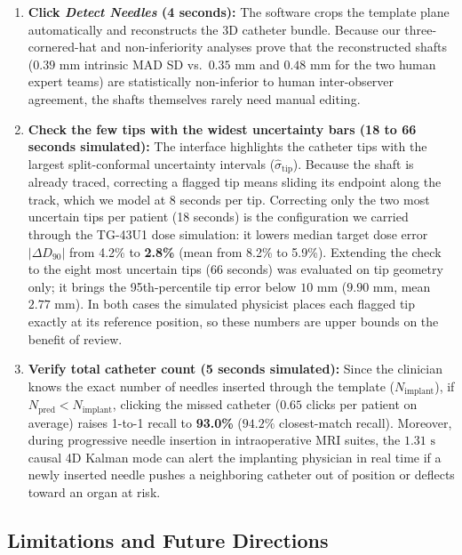 \documentclass[
  11pt,
]{article}
\providecommand{\tightlist}{%
  \setlength{\itemsep}{0pt}\setlength{\parskip}{0pt}}
\begin{document}
\begin{enumerate}
\def\labelenumi{\arabic{enumi}.}
\tightlist
\item
  \textbf{Click \emph{Detect Needles} (4 seconds):} The software crops
  the template plane automatically and reconstructs the 3D catheter
  bundle. Because our three-cornered-hat and non-inferiority analyses
  prove that the reconstructed shafts (\(0.39\text{ mm}\) intrinsic MAD
  SD vs.~\(0.35\text{ mm}\) and \(0.48\text{ mm}\) for the two human
  expert teams) are statistically non-inferior to human inter-observer
  agreement, the shafts themselves rarely need manual editing.
\item
  \textbf{Check the few tips with the widest uncertainty bars (18 to 66
  seconds simulated):} The interface highlights the catheter tips with
  the largest split-conformal uncertainty intervals
  (\(\hat{\sigma}_{\text{tip}}\)). Because the shaft is already traced,
  correcting a flagged tip means sliding its endpoint along the track,
  which we model at 8 seconds per tip. Correcting only the two most
  uncertain tips per patient (18 seconds) is the configuration we
  carried through the TG-43U1 dose simulation: it lowers median target
  dose error \(|\Delta D_{90}|\) from 4.2\% to \textbf{2.8\%} (mean from
  8.2\% to 5.9\%). Extending the check to the eight most uncertain tips
  (66 seconds) was evaluated on tip geometry only; it brings the
  95th-percentile tip error below \(10\text{ mm}\) (\(9.90\text{ mm}\),
  mean \(2.77\text{ mm}\)). In both cases the simulated physicist places
  each flagged tip exactly at its reference position, so these numbers
  are upper bounds on the benefit of review.
\item
  \textbf{Verify total catheter count (5 seconds simulated):} Since the
  clinician knows the exact number of needles inserted through the
  template (\(N_{\text{implant}}\)), if
  \(N_{\text{pred}} < N_{\text{implant}}\), clicking the missed catheter
  (\(0.65\) clicks per patient on average) raises 1-to-1 recall to
  \textbf{93.0\%} (\(94.2\%\) closest-match recall). Moreover, during
  progressive needle insertion in intraoperative MRI suites, the
  \(1.31\text{ s}\) causal 4D Kalman mode can alert the implanting
  physician in real time if a newly inserted needle pushes a neighboring
  catheter out of position or deflects toward an organ at risk.
\end{enumerate}

\subsection{Limitations and Future
Directions}\label{limitations-and-future-directions}
\end{document}
